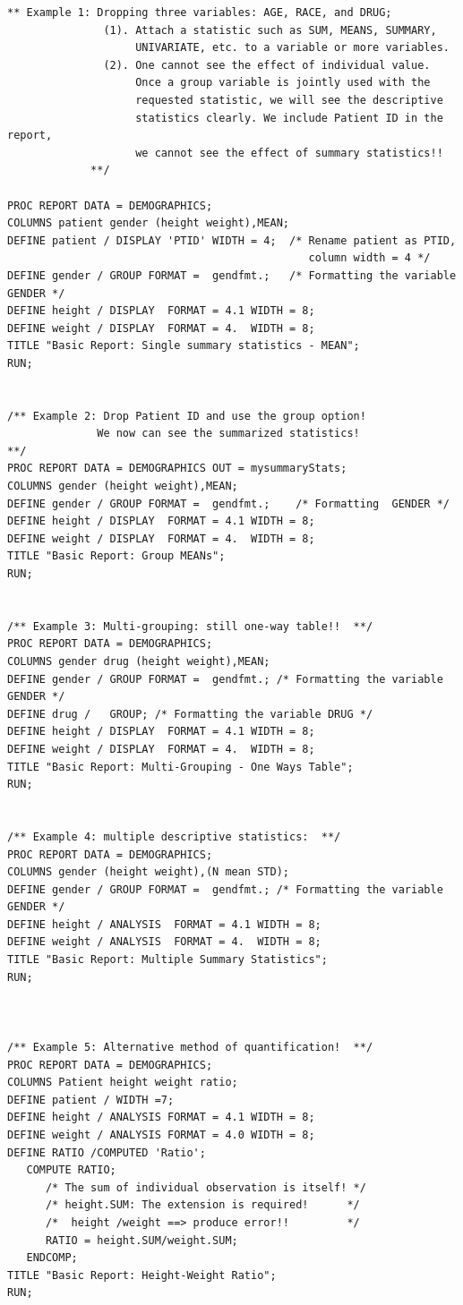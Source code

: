 \documentclass[
]{book}
\begin{document}
\begin{verbatim}
** Example 1: Dropping three variables: AGE, RACE, and DRUG;                      
               (1). Attach a statistic such as SUM, MEANS, SUMMARY, 
                    UNIVARIATE, etc. to a variable or more variables.
               (2). One cannot see the effect of individual value. 
                    Once a group variable is jointly used with the 
                    requested statistic, we will see the descriptive
                    statistics clearly. We include Patient ID in the report, 
                    we cannot see the effect of summary statistics!!
             **/
             
PROC REPORT DATA = DEMOGRAPHICS;
COLUMNS patient gender (height weight),MEAN;
DEFINE patient / DISPLAY 'PTID' WIDTH = 4;  /* Rename patient as PTID, 
                                               column width = 4 */
DEFINE gender / GROUP FORMAT =  gendfmt.;   /* Formatting the variable GENDER */
DEFINE height / DISPLAY  FORMAT = 4.1 WIDTH = 8;  
DEFINE weight / DISPLAY  FORMAT = 4.  WIDTH = 8;
TITLE "Basic Report: Single summary statistics - MEAN";
RUN;


/** Example 2: Drop Patient ID and use the group option! 
              We now can see the summarized statistics!
**/
PROC REPORT DATA = DEMOGRAPHICS OUT = mysummaryStats;
COLUMNS gender (height weight),MEAN;
DEFINE gender / GROUP FORMAT =  gendfmt.;    /* Formatting  GENDER */
DEFINE height / DISPLAY  FORMAT = 4.1 WIDTH = 8;  
DEFINE weight / DISPLAY  FORMAT = 4.  WIDTH = 8;
TITLE "Basic Report: Group MEANs";
RUN;


/** Example 3: Multi-grouping: still one-way table!!  **/
PROC REPORT DATA = DEMOGRAPHICS;
COLUMNS gender drug (height weight),MEAN;
DEFINE gender / GROUP FORMAT =  gendfmt.; /* Formatting the variable GENDER */
DEFINE drug /   GROUP; /* Formatting the variable DRUG */
DEFINE height / DISPLAY  FORMAT = 4.1 WIDTH = 8;  
DEFINE weight / DISPLAY  FORMAT = 4.  WIDTH = 8;
TITLE "Basic Report: Multi-Grouping - One Ways Table";
RUN;


/** Example 4: multiple descriptive statistics:  **/
PROC REPORT DATA = DEMOGRAPHICS;
COLUMNS gender (height weight),(N mean STD);
DEFINE gender / GROUP FORMAT =  gendfmt.; /* Formatting the variable GENDER */
DEFINE height / ANALYSIS  FORMAT = 4.1 WIDTH = 8;  
DEFINE weight / ANALYSIS  FORMAT = 4.  WIDTH = 8;
TITLE "Basic Report: Multiple Summary Statistics";
RUN;



/** Example 5: Alternative method of quantification!  **/
PROC REPORT DATA = DEMOGRAPHICS;
COLUMNS Patient height weight ratio;
DEFINE patient / WIDTH =7;
DEFINE height / ANALYSIS FORMAT = 4.1 WIDTH = 8;  
DEFINE weight / ANALYSIS FORMAT = 4.0 WIDTH = 8;
DEFINE RATIO /COMPUTED 'Ratio';
   COMPUTE RATIO;
      /* The sum of individual observation is itself! */
      /* height.SUM: The extension is required!      */
      /*  height /weight ==> produce error!!         */
      RATIO = height.SUM/weight.SUM; 
   ENDCOMP;
TITLE "Basic Report: Height-Weight Ratio";
RUN;




\end{verbatim}
\end{document}
